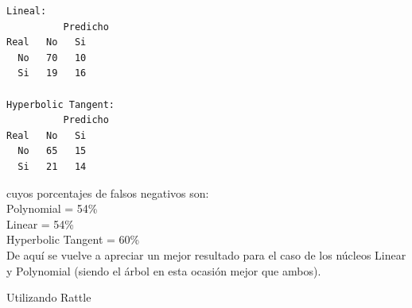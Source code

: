 \documentclass[11pt,a4paper]{report}
\begin{document}
\begin{itemize}
\begin{verbatim}
Lineal:
	      Predicho
Real   No 	Si
  No   70 	10
  Si   19 	16

Hyperbolic Tangent:
	      Predicho
Real   No 	Si
  No   65 	15 
  Si   21 	14
\end{verbatim}
cuyos porcentajes de falsos negativos son:\\
Polynomial = 54\%\\
Linear = 54\%\\
Hyperbolic Tangent = 60\%\\

De aquí se vuelve a apreciar un mejor resultado para el caso de los núcleos Linear y Polynomial (siendo el árbol en esta ocasión mejor que ambos).\\

\end{itemize}









\begin{center}
Utilizando Rattle
\end{center}
\end{document}
